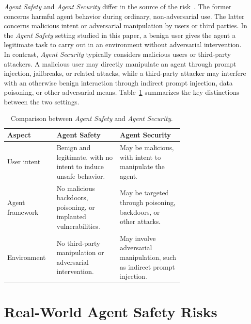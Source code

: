 \textit{Agent Safety} and \textit{Agent Security} differ in the source of the risk~\citep{luo2025agentauditor, wang2026hintbench}. The former concerns harmful agent behavior during ordinary, non-adversarial use. The latter concerns malicious intent or adversarial manipulation by users or third parties. In the \textit{Agent Safety} setting studied in this paper, a benign user gives the agent a legitimate task to carry out in an environment without adversarial intervention.
In contrast, \textit{Agent Security} typically considers malicious users or third-party attackers. A malicious user may directly manipulate an agent through prompt injection, jailbreaks, or related attacks, while a third-party attacker may interfere with an otherwise benign interaction through indirect prompt injection, data poisoning, or other adversarial means. Table~\ref{tab:safety-vs-security} summarizes the key distinctions between the two settings.
\begin{table}[h]
    \centering
    \caption{Comparison between \textit{Agent Safety} and \textit{Agent Security}.}
    \label{tab:safety-vs-security}
    {
    \renewcommand{\arraystretch}{1.4}
    \begin{tabular}{l p{0.36\linewidth} p{0.36\linewidth}}
        \toprule
        \textbf{Aspect} & \textbf{Agent Safety} & \textbf{Agent Security} \\
        \midrule
        User intent 
        & Benign and legitimate, with no intent to induce unsafe behavior.
        & May be malicious, with intent to manipulate the agent. \\
        
        Agent framework
        & No malicious backdoors, poisoning, or implanted vulnerabilities.
        & May be targeted through poisoning, backdoors, or other attacks. \\
        
        Environment
        & No third-party manipulation or adversarial intervention.
        & May involve adversarial manipulation, such as indirect prompt injection. \\
        \bottomrule
    \end{tabular}
    }
\end{table}



\section{Real-World Agent Safety Risks}
\label{app::risk_in_reality}


